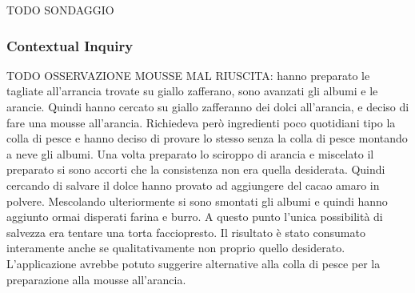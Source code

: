 

TODO SONDAGGIO
\subsubsection{Contextual Inquiry}

TODO OSSERVAZIONE MOUSSE MAL RIUSCITA:
hanno preparato le tagliate all'arrancia trovate su giallo zafferano,
sono avanzati gli albumi e le arancie. Quindi hanno cercato su giallo
zafferanno dei dolci all'arancia, e deciso di fare una mousse
all'arancia. Richiedeva però ingredienti poco quotidiani tipo la colla
di pesce e hanno deciso di provare lo stesso senza la colla di pesce
montando a neve gli albumi. Una volta preparato lo sciroppo di arancia e
miscelato il preparato si sono accorti che la consistenza non era quella
desiderata. Quindi cercando di salvare il dolce hanno provato ad
aggiungere del cacao amaro in polvere. Mescolando ulteriormente si sono
smontati gli albumi e quindi hanno aggiunto ormai disperati farina e
burro. A questo punto l'unica possibilità di salvezza era tentare una
torta facciopresto. Il risultato è stato consumato interamente anche se
qualitativamente non proprio quello desiderato. L'applicazione avrebbe potuto suggerire
alternative alla colla di pesce per la preparazione alla
mousse all'arancia.

